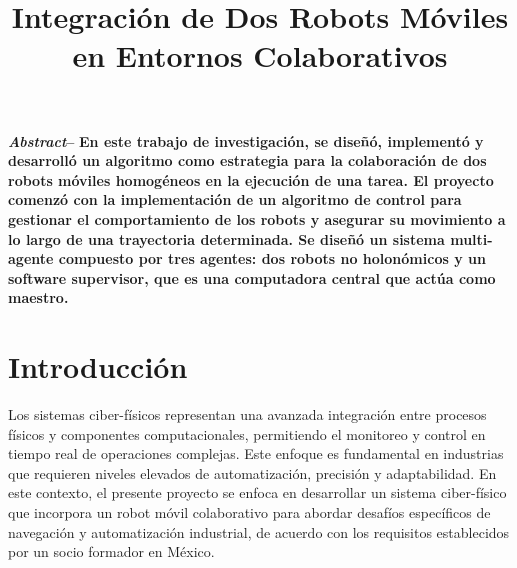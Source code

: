\documentclass[conference]{IEEEtran}
\begin{document}
\title{Integración de Dos Robots Móviles en Entornos Colaborativos\\}

\author{
\and
{}
\and
{}
\and
{}
}

\maketitle

\textbf{\textit{Abstract}--} \textbf{En este trabajo de investigación, se diseñó, implementó y desarrolló un algoritmo como estrategia para la colaboración de dos robots móviles homogéneos en la ejecución de una tarea. El proyecto comenzó con la implementación de un algoritmo de control para gestionar el comportamiento de los robots y asegurar su movimiento a lo largo de una trayectoria determinada. Se diseñó un sistema multi-agente compuesto por tres agentes: dos robots no holonómicos y un software supervisor, que es una computadora central que actúa como maestro.}


\section{Introducción}
Los sistemas ciber-físicos representan una avanzada integración entre procesos físicos y componentes computacionales, permitiendo el monitoreo y control en tiempo real de operaciones complejas. Este enfoque es fundamental en industrias que requieren niveles elevados de automatización, precisión y adaptabilidad. En este contexto, el presente proyecto se enfoca en desarrollar un sistema ciber-físico que incorpora un robot móvil colaborativo para abordar desafíos específicos de navegación y automatización industrial, de acuerdo con los requisitos establecidos por un socio formador en México.
\end{document}
